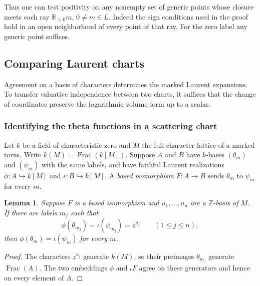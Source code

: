 \documentclass[11pt,reqno]{amsart}
\numberwithin{equation}{section}
\newtheorem{lemma}[theorem]{Lemma}
\theoremstyle{definition}
\theoremstyle{remark}
\DeclareMathOperator{\Frac}{Frac}
\begin{document}
Thus one can test positivity on any nonempty set of generic points
whose closure meets each ray \(\mathbb R_{>0}m\),
\(0\ne m\in L\). Indeed the sign conditions used in the proof hold
in an open neighborhood of every point of that ray. For the zero label
any generic point suffices.

\subsection{Comparing Laurent charts}\label{subsec:based-scattering}

Agreement on a basis of characters determines the marked Laurent
expansions. To transfer valuative independence between two charts,
it suffices that the change of coordinates preserve the logarithmic
volume form up to a scalar.

\subsubsection{Identifying the theta functions in a scattering chart}

Let \(k\) be a field of characteristic zero and \(M\) the full character
lattice of a marked torus. Write \(k(M)=\Frac (k[M])\).
Suppose \(A\) and \(B\) have \(k\)-bases \((\theta_m)\) and
\((\psi_m)\) with the same labels, and have faithful Laurent realizations
\(\phi:A\hookrightarrow k[M]\) and \(\iota:B\hookrightarrow k[M]\).
A \emph{based isomorphism} \(F:A\to B\) sends \(\theta_m\) to
\(\psi_m\) for every \(m\).

\begin{lemma}\label{lem:scattering-chart-marking}
Suppose \(F\) is a based isomorphism and \(u_1,\dots,u_n\) are a
\(\mathbb Z\)-basis of \(M\). If there are labels \(m_j\) such that
\[ \phi(\theta_{m_j})=\iota(\psi_{m_j})=z^{u_j} \qquad(1\le j\le n), \]
then \(\phi(\theta_m)=\iota(\psi_m)\) for every \(m\).
\end{lemma}
\begin{proof}
The characters \(z^{u_j}\) generate \(k(M)\), so their preimages
\(\theta_{m_j}\) generate \(\Frac(A)\). The two embeddings \(\phi\)
and \(\iota F\) agree on these generators and hence on every element of \(A\).
\end{proof}
\end{document}
